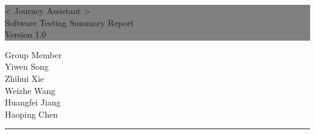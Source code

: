 \documentclass[10pt]{article}
\begin{document}

\begin{titlepage} %
	
	
	\colorbox{grey}{
		\parbox[t]{1.1\textwidth}{ %
			\parbox[t]{1.02\textwidth}{ %
				\raggedleft %
				\fontsize{34pt}{40pt}\selectfont %
				\vspace{0.7cm} %
				
				< Journey Assistant >\\
                Software Testing Summary Report\\
                Version 1.0\\
				
				\vspace{0.7cm} %
			}
		}
	}
	
	\vfill %
	
	
	\parbox[t]{1\textwidth}{ %
		\raggedleft %
		\large %
		{\Large Group Member}\\[4pt] %
        Yiwen Song\\
        Zhihui Xie\\
        Weizhe Wang\\
        Huangfei Jiang\\
        Haoping Chen\\
		
		\hfill\rule{0.2\linewidth}{1pt}%
    }
    
	
\end{titlepage}
\end{document}
